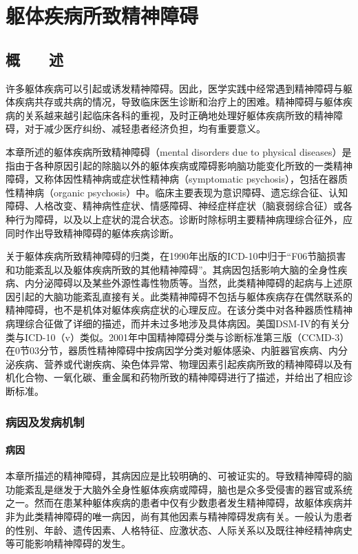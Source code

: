 \chapter{躯体疾病所致精神障碍}

\section{概　　述}

许多躯体疾病可以引起或诱发精神障碍。因此，医学实践中经常遇到精神障碍与躯体疾病共存或共病的情况，导致临床医生诊断和治疗上的困难。精神障碍与躯体疾病的关系越来越引起临床各科的重视，及时正确地处理好躯体疾病所致的精神障碍，对于减少医疗纠纷、减轻患者经济负担，均有重要意义。

本章所述的躯体疾病所致精神障碍（mental disorders due to physical
diseases）是指由于各种原因引起的除脑以外的躯体疾病或障碍影响脑功能变化所致的一类精神障碍，又称体因性精神病或症状性精神病（symptomatic
psychosis），包括在器质性精神病（organic
psychosis）中。临床主要表现为意识障碍、遗忘综合征、认知障碍、人格改变、精神病性症状、情感障碍、神经症样症状（脑衰弱综合征）或各种行为障碍，以及以上症状的混合状态。诊断时除标明主要精神病理综合征外，应同时作出导致精神障碍的躯体疾病诊断。

关于躯体疾病所致精神障碍的归类，在1990年出版的ICD-10中归于“F06节脑损害和功能紊乱以及躯体疾病所致的其他精神障碍”。其病因包括影响大脑的全身性疾病、内分泌障碍以及某些外源性毒性物质等。当然，此类精神障碍的起病与上述原因引起的大脑功能紊乱直接有关。此类精神障碍不包括与躯体疾病存在偶然联系的精神障碍，也不是机体对躯体疾病症状的心理反应。在该分类中对各种器质性精神病理综合征做了详细的描述，而并未过多地涉及具体病因。美国DSM-IV的有关分类与ICD-10（v）类似。2001年中国精神障碍分类与诊断标准第三版（CCMD-3）在0节03分节，器质性精神障碍中按病因学分类对躯体感染、内脏器官疾病、内分泌疾病、营养或代谢疾病、染色体异常、物理因素引起疾病所致的精神障碍以及有机化合物、一氧化碳、重金属和药物所致的精神障碍进行了描述，并给出了相应诊断标准。

\subsection{病因及发病机制}

\subsubsection{病因}

本章所描述的精神障碍，其病因应是比较明确的、可被证实的。导致精神障碍的脑功能紊乱是继发于大脑外全身性躯体疾病或障碍，脑也是众多受侵害的器官或系统之一。然而在患某种躯体疾病的患者中仅有少数患者发生精神障碍，故躯体疾病并非为此类精神障碍的唯一病因，尚有其他因素与精神障碍发病有关。一般认为患者的性别、年龄、遗传因素、人格特征、应激状态、人际关系以及既往神经精神病史等可能影响精神障碍的发生。

